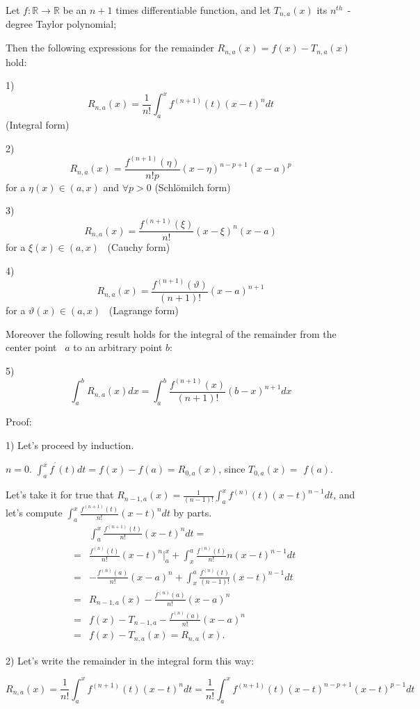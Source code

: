 \documentclass[12pt]{article}
\begin{document}
Let $f:\mathbb{R}\rightarrow \mathbb{R}$ be an $n+1$ times differentiable function, and let $%
T_{n,a}(x)$ its $n^{th\text{ }}$-degree Taylor polynomial;

Then the following expressions for the remainder $R_{n,a}(x)=f(x)-T_{n,a}(x)$
hold:

1) $$R_{n,a}(x)=\frac{1}{n!}\int_{a}^{x}f^{(n+1)}(t)(x-t)^{n}dt$$ (Integral
form)

2) $$R_{n,a}(x)=\frac{f^{(n+1)}(\eta )}{n!p}(x-\eta)^{n-p+1}(x-a)^{p}$$ for a $\eta (x)\in (a,x)$ and $\forall p>0$ (Schl\"omilch form)

3) $$R_{n,a}(x)=\frac{f^{(n+1)}(\xi )}{n!}(x-\xi )^{n}(x-a)$$ for a $\xi
(x)\in (a,x)$ \ (Cauchy form)

4) $$R_{n,a}(x)=\frac{f^{(n+1)}(\vartheta )}{(n+1)!}(x-a)^{n+1}$$ for a $%
\vartheta (x)\in (a,x)$ \ (Lagrange form)

Moreover the following result holds for the integral of the remainder from
the center point \ $a$ to an arbitrary point $b$: 

5) $$\int_{a}^{b}R_{n,a}(x)dx=\int_{a}^{b}\frac{f^{(n+1)}(x)}{(n+1)!}%
(b-x)^{n+1}dx$$

Proof:

1) Let's proceed by induction.

$n=0.$ $\int_{a}^{x}f^{^{\prime }}(t)dt=f(x)-f(a)=R_{0,a}(x)$, since $%
T_{0,a}(x)=$ $f(a)$.

Let's take it for true that $R_{n-1,a}(x)=\frac{1}{(n-1)!}%
\int_{a}^{x}f^{(n)}(t)(x-t)^{n-1}dt$,
and let's compute $\int_{a}^{x}\frac{f^{(n+1)}(t)}{n!}(x-t)^{n}dt$ by parts.
\begin{eqnarray*}
&&\int_{a}^{x}\frac{f^{(n+1)}(t)}{n!}(x-t)^{n}dt= \\
&=&\frac{f^{(n)}(t)}{n!}(x-t)^{n}|_{a}^{x}+\int_{x}^{a}\frac{f^{(n)}(t)}{n!}%
n(x-t)^{n-1}dt \\
&=&-\frac{f^{(n)}(a)}{n!}(x-a)^{n}+\int_{x}^{a}\frac{f^{(n)}(t)}{(n-1)!}%
(x-t)^{n-1}dt \\
&=&R_{n-1,a}(x)-\frac{f^{(n)}(a)}{n!}(x-a)^{n} \\
&=&f(x)-T_{n-1,a}-\frac{f^{(n)}(a)}{n!}(x-a)^{n} \\
&=&f(x)-T_{n,a}(x)=R_{n,a}(x).
\end{eqnarray*}

2) Let's write the remainder in the integral form this way:

\[
R_{n,a}(x)=\frac{1}{n!}\int_{a}^{x}f^{(n+1)}(t)(x-t)^{n}dt=\frac{1}{n!}%
\int_{a}^{x}f^{(n+1)}(t)(x-t)^{n-p+1}(x-t)^{p-1}dt
\]
\end{document}
